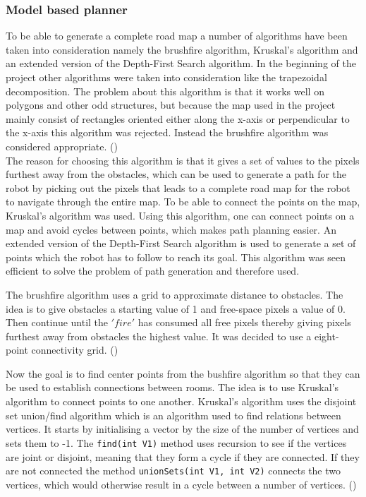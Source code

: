 \documentclass[../Head/Main.tex]{subfiles}
\begin{document}
\subsubsection{Model based planner}
\label{subsec:design_model_based}
To be able to generate a complete road map a number of algorithms have been taken into consideration namely the brushfire algorithm, Kruskal's algorithm and an extended version of the Depth-First Search algorithm. In the beginning of the project other algorithms were taken into consideration like the trapezoidal decomposition. The problem about this algorithm is that it works well on polygons and other odd structures, but because the map used in the project mainly consist of rectangles oriented either along the x-axis or perpendicular to the x-axis this algorithm was rejected. Instead the brushfire algorithm was considered appropriate. (\cite[162-168]{ROB})\\ 
The reason for choosing this algorithm is that it gives a set of values to the pixels furthest away from the obstacles, which can be used to generate a path for the robot by picking out the pixels that leads to a complete road map for the robot to navigate through the entire map. To be able to connect the points on the map, Kruskal's algorithm was used. Using this algorithm, one can connect points on a map and avoid cycles between points, which makes path planning easier. An extended version of the Depth-First Search algorithm is used to generate a set of points which the robot has to follow to reach its goal. This algorithm was seen efficient to solve the problem of path generation and therefore used.\par 

The brushfire algorithm uses a grid to approximate distance to obstacles. The idea is to give obstacles a starting value of 1 and free-space pixels a value of 0. Then continue until the $'fire'$ has consumed all free pixels thereby giving pixels furthest away from obstacles the highest value. It was decided to use a eight-point connectivity grid. (\cite[86-89]{ROB}) \par

Now the goal is to find center points from the bushfire algorithm so that they can be used to establish connections between rooms. The idea is to use Kruskal's algorithm to connect points to one another.  Kruskal's algorithm uses the disjoint set union/find algorithm which is an algorithm used to find relations between vertices. It starts by initialising a vector by the size of the number of vertices and sets them to -1. The \texttt{find(int V1)} method uses recursion to see if the vertices are joint or disjoint, meaning that they form a cycle if they are connected. If they are not connected the method  \texttt{unionSets(int V1, int V2)} connects the two vertices, which would otherwise result in a cycle between a number of vertices. (\cite[356-419]{ADA})
\end{document}
